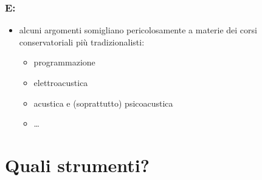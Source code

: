 \documentclass[compress,\mode]{beamer}
\begin{document}
\begin{frame}

  \frametitle<+->{E:}

    \begin{itemize}[<+- | alert@+>]

       \item alcuni argomenti somigliano pericolosamente a materie
             dei corsi conservatoriali pi\`u tradizionalisti:

       \begin{itemize}[<+- | alert@+>]

         \item programmazione

         \item elettroacustica

         \item acustica e (soprattutto) psicoacustica

         \item \ldots

       \end{itemize}

    \end{itemize}

\end{frame}

\section{Quali strumenti?}
\end{document}
